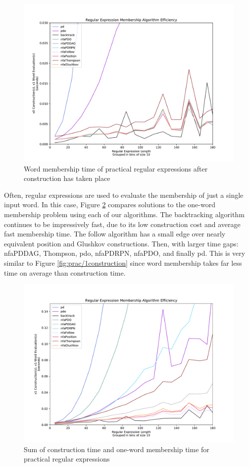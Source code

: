 \begin{figure}[H]
  \centering
  \includegraphics[width=0.75\linewidth]{fig/prac/1evaluation}
  \caption{Word membership time of practical regular expressions after construction has taken place}
  \label{fig:prac/1evaluation}
\end{figure}

Often, regular expressions are used to evaluate the membership of just a single input word. In this case, Figure \ref{fig:prac/1const1eval} compares solutions to the one-word membership problem using each of our algorithms. The backtracking algorithm continues to be impressively fast, due to its low construction cost and average fast membership time. The follow algorithm has a small edge over nearly equivalent position and Glushkov constructions. Then, with larger time gaps: nfaPDDAG, Thompson, pdo, nfaPDRPN, nfaPDO, and finally pd. This is very similar to Figure \ref{fig:prac/1construction} since word membership takes far less time on average than construction time.

\begin{figure}[H]
  \center
  \includegraphics[width=0.75\linewidth]{fig/prac/1const1eval}
  \caption{Sum of construction time and one-word membership time for practical regular expressions}
  \label{fig:prac/1const1eval}
\end{figure}

